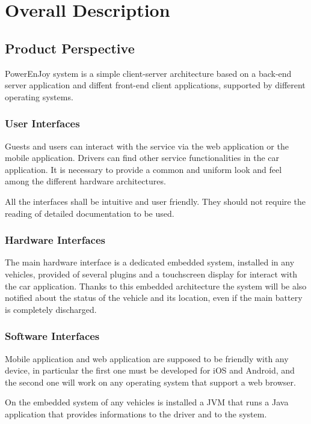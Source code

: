 \section{Overall Description}\label{sec overall-desc}

\subsection{Product Perspective}
PowerEnJoy system is a simple client-server architecture based on a back-end server application and diffent front-end client applications, supported by different operating systems.

\subsubsection{User Interfaces}
Guests and users can interact with the service via the web application or the mobile application. Drivers can find other service functionalities in the car application. It is necessary to provide a common and uniform look and feel among the different hardware architectures.

All the interfaces shall be intuitive and user friendly. They should not require the reading of detailed documentation to be used.

\subsubsection{Hardware Interfaces}

The main hardware interface is a dedicated embedded system, installed in any vehicles, provided of several plugins and a touchscreen display for interact with the car application.
Thanks to this embedded architecture the system will be also notified about the status of the vehicle and its location, even if the main battery is completely discharged.

\subsubsection{Software Interfaces}
Mobile application and web application are supposed to be friendly with any device, in particular the first one must be developed for iOS and Android, and the second one will work on any operating system that support a web browser.

On the embedded system of any vehicles is installed a JVM that runs a Java application that provides informations to the driver and to the system.

